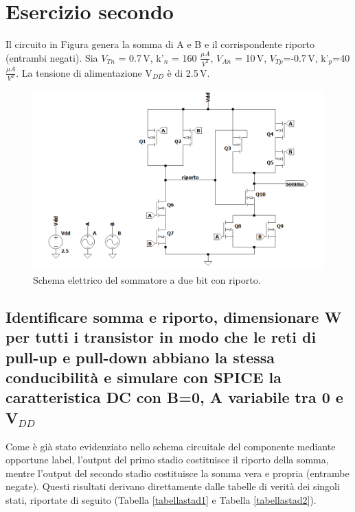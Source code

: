 \documentclass[a4paper,10pt]{article}
\begin{document}
\newpage
\section{Esercizio secondo}
Il circuito in Figura genera la somma di A e B e il corrispondente riporto (entrambi negati). Sia $V_{Tn}$ = 0.7$\,$V, k’$_n$ = 160 $\frac{\mu A}{V^2}$, $V_{An}$ = 10$\,$V, $V_{Tp}$=-0.7$\,$V, k’$_p$=40 $\frac{\mu A}{V^2}$. La tensione di alimentazione V$_{DD}$ è di 2.5$\,$V.
\begin{figure}[h!]
  	\centering
 	\includegraphics[width=0.7\linewidth]{ckt2.png}
  	\caption{Schema elettrico del sommatore a due bit con riporto.}
  	\label{fig:ckt2}
\end{figure}

\subsection{Identificare somma e riporto, dimensionare W per tutti i transistor in modo che le reti di pull-up e pull-down abbiano la stessa conducibilità e simulare con SPICE la caratteristica DC con B=0, A variabile tra 0 e V$_{DD}$}
Come è già stato evidenziato nello schema circuitale del componente mediante opportune label, l'output del primo stadio costituisce il riporto della somma, mentre l'output del secondo stadio costituisce la somma vera e propria (entrambe negate). Questi risultati derivano direttamente dalle tabelle di verità dei singoli stati, riportate di seguito (Tabella \ref{tabellastad1} e Tabella \ref{tabellastad2}).
\\
\end{document}
